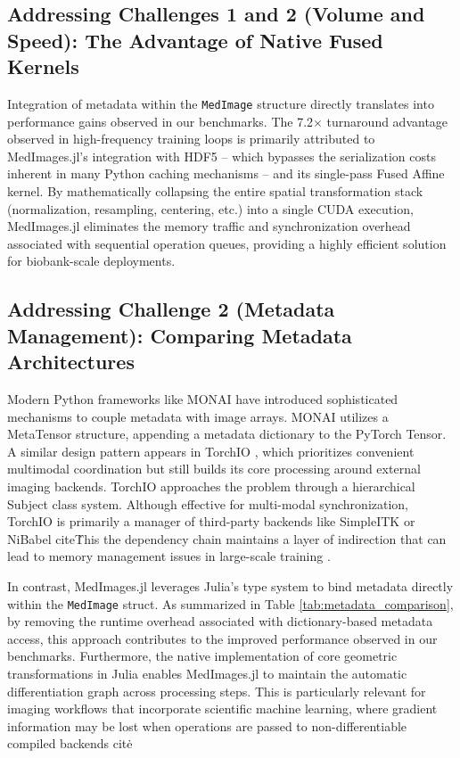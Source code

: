 \documentclass[10pt,letterpaper]{article}
\begin{document}
\subsection*{Addressing Challenges 1 and 2 (Volume and Speed): The Advantage of Native Fused Kernels}
Integration of metadata within the \texttt{MedImage} structure directly translates into performance gains observed in our benchmarks. The 7.2$\times$ turnaround advantage observed in high-frequency training loops is primarily attributed to MedImages.jl's integration with HDF5 -- which bypasses the serialization costs inherent in many Python caching mechanisms -- and its single-pass Fused Affine kernel. By mathematically collapsing the entire spatial transformation stack (normalization, resampling, centering, etc.) into a single CUDA execution, MedImages.jl eliminates the memory traffic and synchronization overhead associated with sequential operation queues, providing a highly efficient solution for biobank-scale deployments.

\subsection*{Addressing Challenge 2 (Metadata Management): Comparing Metadata Architectures}
Modern Python frameworks like MONAI \cite{CardosoLi2022} have introduced sophisticated mechanisms to couple metadata with image arrays. MONAI utilizes a MetaTensor structure, appending a metadata dictionary to the PyTorch Tensor. A similar design pattern appears in TorchIO \cite{perezgarcia2021torchio}, which prioritizes convenient multimodal coordination but still builds its core processing around external imaging backends. TorchIO approaches the problem through a hierarchical Subject class system. Although effective for multi-modal synchronization, TorchIO is primarily a manager of third-party backends  like SimpleITK or NiBabel cite\. This the dependency chain maintains a layer of indirection that can lead to memory management issues in large-scale training \cite{perezgarcia2021torchio}.

In contrast, MedImages.jl leverages Julia's type system to bind metadata directly within the \texttt{MedImage} struct. As summarized in Table \ref{tab:metadata_comparison}, by removing the runtime overhead associated with dictionary-based metadata access, this approach contributes to the improved performance observed in our benchmarks. Furthermore, the native implementation of core geometric transformations in Julia enables MedImages.jl to maintain the automatic differentiation graph across processing steps. This is particularly relevant for imaging workflows that incorporate scientific machine learning, where gradient information may be lost when operations are passed to non-differentiable compiled backends cite\. 
\end{document}

